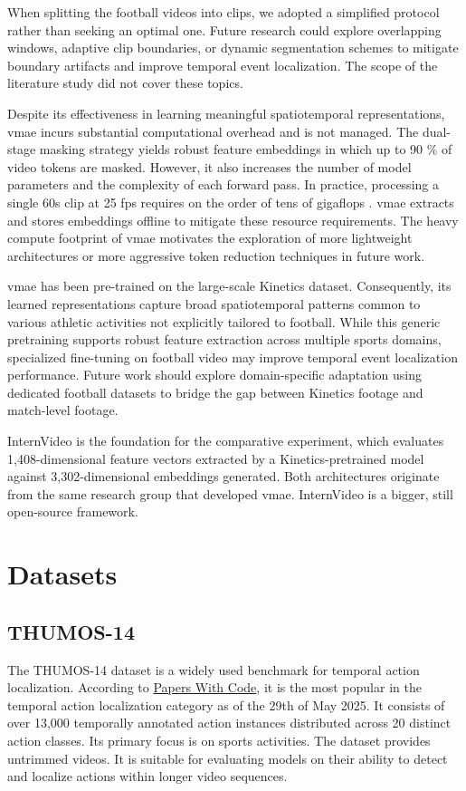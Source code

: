 When splitting the football videos into clips, we adopted a simplified protocol rather than seeking an optimal one. Future research could explore overlapping windows, adaptive clip boundaries, or dynamic segmentation schemes to mitigate boundary artifacts and improve temporal event localization. The scope of the literature study did not cover these topics.

Despite its effectiveness in learning meaningful spatiotemporal representations, \acrfull{vmae} incurs substantial computational overhead and is not managed. The dual-stage masking strategy yields robust feature embeddings in which up to 90 \% of video tokens are masked. However, it also increases the number of model parameters and the complexity of each forward pass. In practice, processing a single 60s clip at 25 fps requires on the order of tens of gigaflops \cite{wang_videomae_2023}. \acrshort{vmae} extracts and stores embeddings offline to mitigate these resource requirements. The heavy compute footprint of \acrshort{vmae} motivates the exploration of more lightweight architectures or more aggressive token reduction techniques in future work.

\acrshort{vmae} has been pre-trained on the large-scale Kinetics dataset. Consequently, its learned representations capture broad spatiotemporal patterns common to various athletic activities not explicitly tailored to football. While this generic pretraining supports robust feature extraction across multiple sports domains, specialized fine-tuning on football video may improve temporal event localization performance. Future work should explore domain-specific adaptation using dedicated football datasets to bridge the gap between Kinetics footage and match-level footage. 

InternVideo is the foundation for the comparative experiment, which evaluates 1,408-dimensional feature vectors extracted by a Kinetics-pretrained model against 3,302-dimensional embeddings generated. Both architectures originate from the same research group that developed \acrshort{vmae}. InternVideo is a bigger, still open-source framework.


\section{Datasets}
\label{sec:method_datasets}

\subsection{THUMOS-14}
\label{ssec:method_thumos14}
The THUMOS-14 dataset \cite{dataset:thumos} is a widely used benchmark for temporal action localization. According to \hyperlink{https://paperswithcode.com/dataset/thumos14-1}{Papers With Code}, it is the most popular in the temporal action localization category as of the 29th of May 2025. It consists of over 13,000 temporally annotated action instances distributed across 20 distinct action classes. Its primary focus is on sports activities. The dataset provides untrimmed videos. It is suitable for evaluating models on their ability to detect and localize actions within longer video sequences. 

